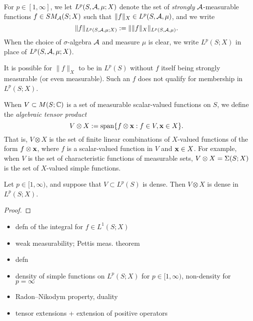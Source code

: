 \begin{defn}
  For $p \in [1,\infty]$, we let $L^p(S,\mathcal{A},\mu;X)$ denote the set of \emph{strongly} $\mathcal{A}$-measurable functions $f \in SM_{\mathcal{A}}(S;X)$ such that $\|f\|_X \in L^p(S,\mathcal{A},\mu)$, and we write
  \begin{equation*}
    \|f\|_{L^p(S,\mathcal{A},\mu;X)} := \| \|f\|_X \|_{L^p(S,\mathcal{A},\mu)}.
  \end{equation*}
  When the choice of $\sigma$-algebra $\mathcal{A}$ and measure $\mu$ is clear, we write $L^p(S;X)$ in place of $L^p(S,\mathcal{A},\mu;X)$.
\end{defn}

\begin{rmk}
  It is possible for $\|f\|_X$ to be in $L^p(S)$ without $f$ itself being strongly measurable (or even measurable).
  Such an $f$ does not qualify for membership in $L^p(S;X)$.
\end{rmk}

When $V \subset M(S;\mathbb{C})$ is a set of measurable scalar-valued functions on $S$, we define the \emph{algebraic tensor product}
\begin{equation*}
  V \otimes X := \mathrm{span}\{f \otimes \mathbf{x} : f \in V, \mathbf{x} \in X\}.
\end{equation*}
That is, $V \otimes X$ is the set of finite linear combinations of $X$-valued functions of the form $f \otimes \mathbf{x}$, where $f$ is a scalar-valued function in $V$ and $\mathbf{x} \in X$.
For example, when $V$ is the set of characteristic functions of measurable sets, $V \otimes X = \Sigma(S;X)$ is the set of $X$-valued simple functions.

\begin{prop}
  Let $p \in [1,\infty)$, and suppose that $V \subset L^p(S)$ is dense.
  Then $V \otimes X$ is dense in $L^p(S;X)$.
\end{prop}

\begin{proof}
  
\end{proof}

\begin{itemize}
\item defn of the integral for $f \in L^1(S;X)$
\item weak measurability; Pettis meas. theorem
\end{itemize}






\begin{itemize}
\item defn
\item density of simple functions on $L^p(S;X)$ for $p \in [1,\infty)$, non-density for $p = \infty$
\item Radon--Nikodym property, duality
\item tensor extensions + extension of positive operators
\end{itemize}


